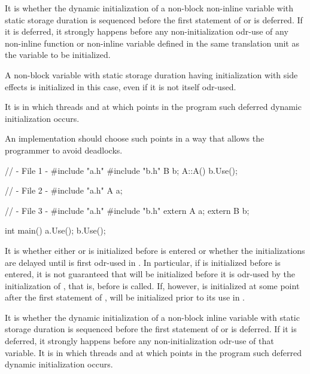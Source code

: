 \pnum
{}%
It is 
whether the dynamic initialization of a
non-block non-inline variable with static storage duration
is sequenced before the first statement of  or is deferred.
If it is deferred, it strongly happens before
any non-initialization odr-use
of any non-inline function or non-inline variable
defined in the same translation unit as the variable to be initialized.
\begin{footnote}
A non-block variable with static storage duration
having initialization
with side effects is initialized in this case,
even if it is not itself odr-used.
\end{footnote}
It is 
in which threads and at which points in the program such deferred dynamic initialization occurs.

\recommended
An implementation should choose such points in a way
that allows the programmer to avoid deadlocks.
\begin{example}
\begin{codeblock}
// - File 1 -
#include "a.h"
#include "b.h"
B b;
A::A() {
  b.Use();
}

// - File 2 -
#include "a.h"
A a;

// - File 3 -
#include "a.h"
#include "b.h"
extern A a;
extern B b;

int main() {
  a.Use();
  b.Use();
}
\end{codeblock}

It is 
whether either  or  is
initialized before  is entered or whether the
initializations are delayed until  is first odr-used in
. In particular, if  is initialized before
 is entered, it is not guaranteed that  will be
initialized before it is odr-used by the initialization of , that
is, before  is called. If, however,  is initialized
at some point after the first statement of ,  will
be initialized prior to its use in .
\end{example}

\pnum
It is 
whether the dynamic initialization of a
non-block inline variable with static storage duration
is sequenced before the first statement of  or is deferred.
If it is deferred, it strongly happens before
any non-initialization odr-use
of that variable.
It is 
in which threads and at which points in the program such deferred dynamic initialization occurs.

